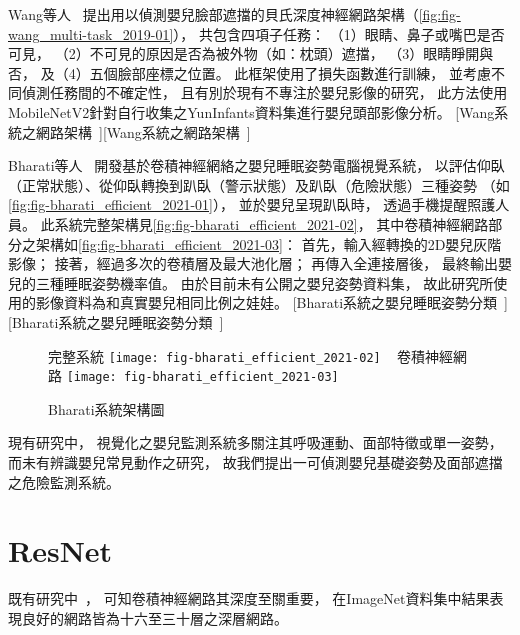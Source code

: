 \documentclass[class=NCU_thesis, crop=false]{standalone}
\begin{document}
Wang等人~\cite{wang_multi-task_2019}
提出用以偵測嬰兒臉部遮擋的貝氏深度神經網路架構（\cref{fig:fig-wang_multi-task_2019-01}），
共包含四項子任務：
（1）眼睛、鼻子或嘴巴是否可見，
（2）不可見的原因是否為被外物（如：枕頭）遮擋，
（3）眼睛睜開與否，
及（4）五個臉部座標之位置。
此框架使用了損失函數進行訓練，
並考慮不同偵測任務間的不確定性，
且有別於現有不專注於嬰兒影像的研究，
此方法使用MobileNetV2針對自行收集之YunInfants資料集進行嬰兒頭部影像分析。
[Wang系統之網路架構~\cite{wang_multi-task_2019}][Wang系統之網路架構~\cite{wang_multi-task_2019}]

Bharati等人~\cite{bharati_efficient_2021}
開發基於卷積神經網絡之嬰兒睡眠姿勢電腦視覺系統，
以評估仰臥（正常狀態）、從仰臥轉換到趴臥（警示狀態）及趴臥（危險狀態）三種姿勢
（如\cref{fig:fig-bharati_efficient_2021-01}），
並於嬰兒呈現趴臥時，
透過手機提醒照護人員。
此系統完整架構見\cref{fig:fig-bharati_efficient_2021-02}，
其中卷積神經網路部分之架構如\cref{fig:fig-bharati_efficient_2021-03}：
首先，輸入經轉換的2D嬰兒灰階影像；
接著，經過多次的卷積層及最大池化層；
再傳入全連接層後，
最終輸出嬰兒的三種睡眠姿勢機率值。
由於目前未有公開之嬰兒姿勢資料集，
故此研究所使用的影像資料為和真實嬰兒相同比例之娃娃。
[Bharati系統之嬰兒睡眠姿勢分類~\cite{bharati_efficient_2021}][Bharati系統之嬰兒睡眠姿勢分類~\cite{bharati_efficient_2021}]
\begin{figure}[!hbt]
    \centering
    \subcaptionbox
        {完整系統
        \label{fig:fig-bharati_efficient_2021-02}}
        {\texttt{[image: fig-bharati\_efficient\_2021-02]}}
    ~
    \subcaptionbox
        {卷積神經網路
        \label{fig:fig-bharati_efficient_2021-03}}
        {\texttt{[image: fig-bharati\_efficient\_2021-03]}}
    \caption{Bharati系統架構圖~\cite{bharati_efficient_2021}}
    \label{fig:fig-bharati_efficient_2021}
\end{figure}

現有研究中，
視覺化之嬰兒監測系統多關注其呼吸運動、面部特徵或單一姿勢，
而未有辨識嬰兒常見動作之研究，
故我們提出一可偵測嬰兒基礎姿勢及面部遮擋之危險監測系統。

\section{ResNet}
既有研究中~\cite{simonyan_very_2015, szegedy_going_2015, ioffe_batch_2015}，
可知卷積神經網路其深度至關重要，
在ImageNet資料集中結果表現良好的網路皆為十六至三十層之深層網路。
\end{document}
